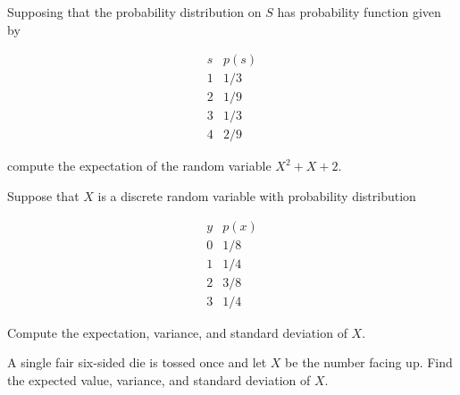 \documentclass[12pt,reqno]{amsart}
\begin{document}
Supposing that the probability distribution on $S$ has probability function given by

	\[
	\begin{array}{c|c}
	s & p(s)  \\ \hline
	1 & 1/3  \\
	2 & 1/9  \\
	3 & 1/3 \\
	4 & 2/9
	\end{array}
	\]

compute the expectation of the random variable $X^2 + X + 2$.\vfill

















\newpage
\prob Suppose that $X$ is a discrete random variable with probability distribution

	\[
	\begin{array}{c|c}
	y & p(x) \\ \hline
	0 & 1/8   \\
	1 & 1/4   \\
	2 & 3/8  \\
	3 & 1/4 
	\end{array}
	\]

Compute the expectation, variance, and standard deviation of $X$.\vfill





















\bigskip
\prob A single fair six-sided die is tossed once and let $X$ be the number facing up. Find the expected value, variance, and standard deviation of $X$.\vfill
\end{document}
